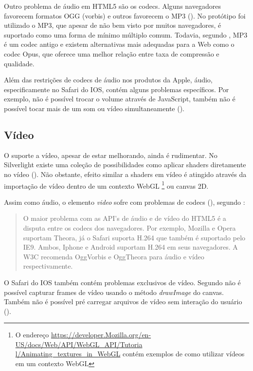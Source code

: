 Outro problema de áudio em HTML5 são os codecs. Alguns
navegadores favorecem formatos OGG (vorbis) e outros favorecem o
MP3 ().
No protótipo foi utilizado o MP3, que apesar de não bem visto por
muitos navegadores, é suportado como uma forma de mínimo múltiplo
comum. Todavia, segundo \citet{opus}, MP3 é um codec antigo e existem
alternativas mais adequadas para a Web como o codec Opus, que oferece
uma melhor relação entre taxa de compressão e qualidade.

Além das restrições de codecs de áudio nos produtos da Apple,
áudio, especificamente no Safari do IOS, contém alguns problemas
específicos. Por exemplo, não é possível trocar o volume
através de JavaScript, também não é possível tocar mais de um
som ou vídeo simultaneamente \autocite{unsolvedMediaHtmlIssues}
().

\subsection{Vídeo}

O suporte a vídeo, apesar de estar melhorando, ainda é rudimentar.
No Silverlight existe uma coleção de possibilidades como aplicar
shaders diretamente no vídeo \autocite[p. 8]{researchOnHtml}
(). Não obstante, efeito similar
a shaders em vídeo é atingido através da importação de
vídeo dentro de um contexto WebGL \footnote{O endereço
\url{https://developer.Mozilla.org/en-US/docs/Web/API/WebGL_API/Tutoria
l/Animating_textures_in_WebGL} contém exemplos de como utilizar vídeos
em um contexto WebGL} ou canvas 2D.

Assim como áudio, o elemento \textit{video} sofre com problemas de
codecs (), segundo \citet{html5Tradeoffs}:
\begin{quote}
O maior problema com as API's de áudio e de vídeo do HTML5 é
a disputa entre os codecs dos navegadores. Por exemplo, Mozilla e
Opera suportam Theora, já o Safari suporta H.264 que também é
suportado pelo IE9. Ambos, Iphone e Android suportam H.264 em seus
navegadores. A W3C recomenda OggVorbis e OggTheora para áudio e vídeo
respectivamente.
\end{quote}

O Safari do IOS também contém problemas exclusivos de vídeo. Segundo
\citet{unsolvedMediaHtmlIssues} não é possível capturar frames de
vídeo usando o método \textit{drawImage} do canvas. Também não é
possível pré carregar arquivos de vídeo sem interação do usuário
().


